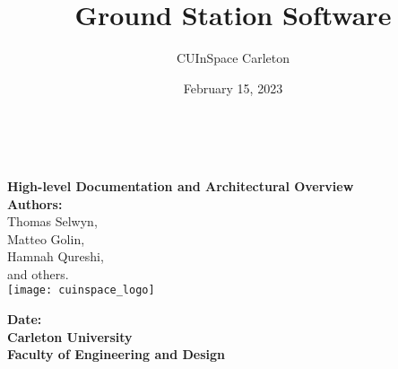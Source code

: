 \title{Ground Station Software}
\author{CUInSpace Carleton}
\date{February 15, 2023}

\makeatletter
    \begin{titlepage}
        \begin{center}

            {\fontsize{34}{50}\selectfont \bf \@title}\\ 
            \vspace{5cm}

            {\bf\Large High-level Documentation and Architectural Overview}\\[3cm] 

            {\large \textbf{Authors:}\\}
            {\large Thomas Selwyn,\\}
            {\large Matteo Golin,\\}
            {\large Hamnah Qureshi,\\}
            {\large and others.\\}
            \texttt{[image: cuinspace\_logo]}
            
            {\large \textbf{Date:} \@date\\}
            {\large \textbf{Carleton University}\\}
            {\large \textbf{Faculty of Engineering and Design}\\}
        \end{center}
    \end{titlepage}
\makeatother